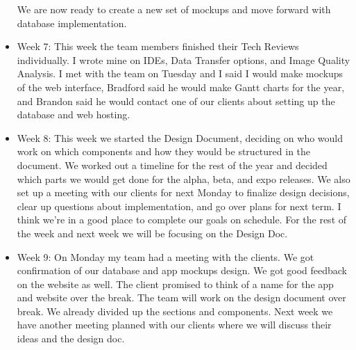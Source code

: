 \documentclass[onecolumn, draftclsnofoot,10pt, compsoc]{IEEEtran}
\begin{document}
\begin{itemize}
We are now ready to create a new set of mockups and move forward with database implementation. 
\item Week 7: This week the team members finished their Tech Reviews individually. I wrote mine on IDEs, Data Transfer options, and Image Quality Analysis. I met with the team on Tuesday and I said I would make mockups of the web interface, Bradford said he would make Gantt charts for the year, and Brandon said he would contact one of our clients about setting up the database and web hosting.
\item Week 8: This week we started the Design Document, deciding on who would work on which components and how they would be structured in the document. We worked out a timeline for the rest of the year and decided which parts we would get done for the alpha, beta, and expo releases. We also set up a meeting with our clients for next Monday to finalize design decisions, clear up questions about implementation, and go over plans for next term. I think we’re in a good place to complete our goals on schedule. For the rest of the week and next week we will be focusing on the Design Doc. 
\item Week 9: On Monday my team had a meeting with the clients. We got confirmation of our database and app mockups design. We got good feedback on the website as well. The client promised to think of a name for the app and website over the break. The team will work on the design document over break. We already divided up the sections and components. Next week we have another meeting planned with our clients where we will discuss their ideas and the design doc. 

 \end{itemize}
\end{document}
